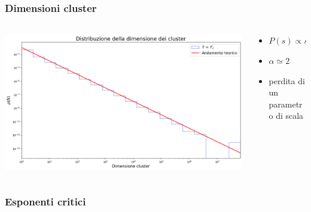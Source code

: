 \begin{frame}
    \frametitle{Dimensioni cluster}
    \framesubtitle{}

    \begin{columns}
        \begin{column}{0.6\textwidth}

            \centering
            \includegraphics[width=\textwidth]{Immagini/simIsing2D/dimCl_Tc.png}

        \end{column}
    
        \begin{column}{0.4\textwidth}


                \begin{itemize}[itemsep=0.5em, label=$\diamond$]
                    \item $P\left(s\right) \propto s^{-\alpha}$
                    \item $\alpha \simeq 2$
                    \item perdita di un parametro di scala
                \end{itemize}
            
        \end{column}
    \end{columns}

    \centering
    
\end{frame}



\begin{frame}
    \frametitle{Esponenti critici}
    \framesubtitle{}
    
\end{frame}